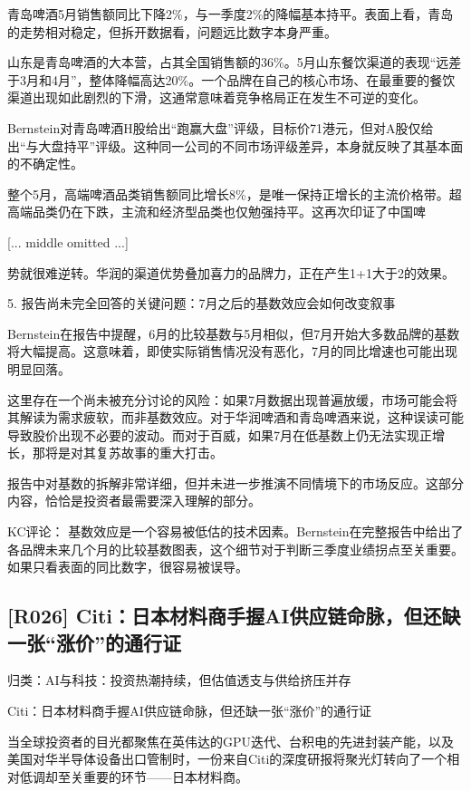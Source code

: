 \documentclass[11pt]{ctexart}
\begin{document}
青岛啤酒5月销售额同比下降2\%，与一季度2\%的降幅基本持平。表面上看，青岛的走势相对稳定，但拆开数据看，问题远比数字本身严重。

山东是青岛啤酒的大本营，占其全国销售额的36\%。5月山东餐饮渠道的表现“远差于3月和4月”，整体降幅高达20\%。一个品牌在自己的核心市场、在最重要的餐饮渠道出现如此剧烈的下滑，这通常意味着竞争格局正在发生不可逆的变化。

Bernstein对青岛啤酒H股给出“跑赢大盘”评级，目标价71港元，但对A股仅给出“与大盘持平”评级。这种同一公司的不同市场评级差异，本身就反映了其基本面的不确定性。

整个5月，高端啤酒品类销售额同比增长8\%，是唯一保持正增长的主流价格带。超高端品类仍在下跌，主流和经济型品类也仅勉强持平。这再次印证了中国啤

[... middle omitted ...]

势就很难逆转。华润的渠道优势叠加喜力的品牌力，正在产生1+1大于2的效果。

5. 报告尚未完全回答的关键问题：7月之后的基数效应会如何改变叙事

Bernstein在报告中提醒，6月的比较基数与5月相似，但7月开始大多数品牌的基数将大幅提高。这意味着，即使实际销售情况没有恶化，7月的同比增速也可能出现明显回落。

这里存在一个尚未被充分讨论的风险：如果7月数据出现普遍放缓，市场可能会将其解读为需求疲软，而非基数效应。对于华润啤酒和青岛啤酒来说，这种误读可能导致股价出现不必要的波动。而对于百威，如果7月在低基数上仍无法实现正增长，那将是对其复苏故事的重大打击。

报告中对基数的拆解非常详细，但并未进一步推演不同情境下的市场反应。这部分内容，恰恰是投资者最需要深入理解的部分。

KC评论： 基数效应是一个容易被低估的技术因素。Bernstein在完整报告中给出了各品牌未来几个月的比较基数图表，这个细节对于判断三季度业绩拐点至关重要。如果只看表面的同比数字，很容易被误导。

\subsection{[R026] Citi：日本材料商手握AI供应链命脉，但还缺一张“涨价”的通行证}
{\small\color{refgray}归类：AI与科技：投资热潮持续，但估值透支与供给挤压并存}

Citi：日本材料商手握AI供应链命脉，但还缺一张“涨价”的通行证

当全球投资者的目光都聚焦在英伟达的GPU迭代、台积电的先进封装产能，以及美国对华半导体设备出口管制时，一份来自Citi的深度研报将聚光灯转向了一个相对低调却至关重要的环节——日本材料商。
\end{document}
